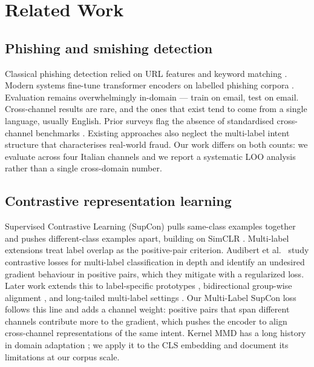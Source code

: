 \documentclass[preprint,12pt,authoryear]{elsarticle}
\begin{document}
\section{Related Work}
\label{sec:related}

\subsection{Phishing and smishing detection}

Classical phishing detection relied on URL features and keyword
matching \citep{sahingoz2019machine}. Modern systems fine-tune
transformer encoders on labelled phishing corpora
\citep{zieni2023survey,devlin2019bert,liu2019roberta}. Evaluation
remains overwhelmingly in-domain --- train on email, test on email.
Cross-channel results are rare, and the ones that exist tend to come
from a single language, usually English. Prior surveys flag the
absence of standardised cross-channel benchmarks
\citep{zieni2023survey}. Existing approaches also neglect the
multi-label intent structure that characterises real-world fraud. Our
work differs on both counts: we evaluate across four Italian
channels and we report a systematic LOO analysis rather than a single
cross-domain number.

\subsection{Contrastive representation learning}

Supervised Contrastive Learning (SupCon) pulls same-class examples
together and pushes different-class examples apart, building on
SimCLR \citep{khosla2020supcon,chen2020simclr}. Multi-label
extensions treat label overlap as the positive-pair criterion.
Audibert et al.\ \citep{audibert2025multilabel} study contrastive
losses for multi-label classification in depth and identify an
undesired gradient behaviour in positive pairs, which they mitigate
with a regularized loss. Later work extends this to label-specific
prototypes \citep{lspcl2025}, bidirectional group-wise alignment
\citep{big2025}, and long-tailed multi-label settings
\citep{abalone2024}. Our Multi-Label SupCon loss follows this line
and adds a channel weight: positive pairs that span different
channels contribute more to the gradient, which pushes the encoder
to align cross-channel representations of the same intent. Kernel
MMD has a long history in domain adaptation
\citep{gretton2012mmd,long2015dan}; we apply it to the CLS embedding
and document its limitations at our corpus scale.
\end{document}
